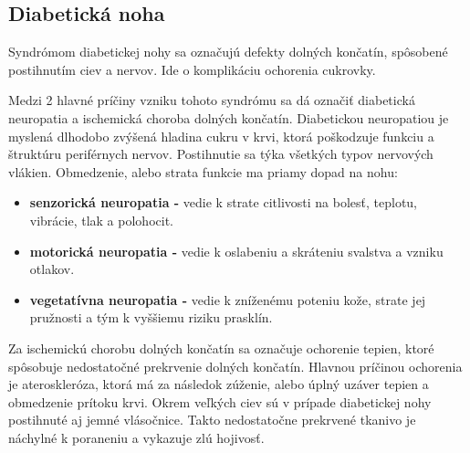\subsection{Diabetická noha}
Syndrómom diabetickej nohy sa označujú defekty dolných končatín, spôsobené postihnutím ciev a nervov. Ide o komplikáciu ochorenia cukrovky.

Medzi 2 hlavné príčiny vzniku tohoto syndrómu sa dá označiť diabetická neuropatia a ischemická choroba dolných končatín. Diabetickou neuropatiou je myslená dlhodobo zvýšená hladina cukru v krvi, ktorá poškodzuje funkciu a štruktúru periférnych nervov. Postihnutie sa týka všetkých typov nervových vlákien. Obmedzenie, alebo strata funkcie ma priamy dopad na nohu:
\begin{itemize}
\item \textbf{senzorická neuropatia -} vedie k strate citlivosti na bolesť, teplotu, vibrácie, tlak a polohocit.
\item \textbf{motorická neuropatia -} vedie k oslabeniu a skráteniu svalstva a vzniku otlakov.
\item \textbf{vegetatívna neuropatia -} vedie k zníženému poteniu kože, strate jej pružnosti a tým k vyššiemu riziku prasklín.
\end{itemize}

Za ischemickú chorobu dolných končatín sa označuje ochorenie tepien, ktoré spôsobuje nedostatočné prekrvenie dolných končatín. Hlavnou príčinou ochorenia je ateroskleróza, ktorá má za následok zúženie, alebo úplný uzáver tepien a obmedzenie prítoku krvi. Okrem veľkých ciev sú v prípade diabetickej nohy postihnuté aj jemné vlásočnice. Takto nedostatočne prekrvené tkanivo je náchylné k poraneniu a vykazuje zlú hojivosť.

